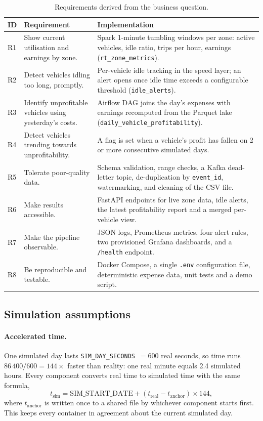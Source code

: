\documentclass[11pt,a4paper]{article}
\newcommand{\code}[1]{\texttt{\small #1}}
\begin{document}
\begin{table}[H]
\centering\small
\begin{tabularx}{\linewidth}{l Y Y}
\toprule
\textbf{ID} & \textbf{Requirement} & \textbf{Implementation} \\
\midrule
R1 & Show current utilisation and earnings by zone. &
Spark 1-minute tumbling windows per zone: active vehicles, idle ratio, trips per hour, earnings
(\code{rt\_zone\_metrics}). \\
R2 & Detect vehicles idling too long, promptly. &
Per-vehicle idle tracking in the speed layer; an alert opens once idle time exceeds a
configurable threshold (\code{idle\_alerts}). \\
R3 & Identify unprofitable vehicles using yesterday's costs. &
Airflow DAG joins the day's expenses with earnings recomputed from the Parquet lake
(\code{daily\_vehicle\_profitability}). \\
R4 & Detect vehicles trending towards unprofitability. &
A flag is set when a vehicle's profit has fallen on 2 or more consecutive simulated days. \\
R5 & Tolerate poor-quality data. &
Schema validation, range checks, a Kafka dead-letter topic, de-duplication by \code{event\_id},
watermarking, and cleaning of the CSV file. \\
R6 & Make results accessible. &
FastAPI endpoints for live zone data, idle alerts, the latest profitability report and a merged
per-vehicle view. \\
R7 & Make the pipeline observable. &
JSON logs, Prometheus metrics, four alert rules, two provisioned Grafana dashboards, and a
\code{/health} endpoint. \\
R8 & Be reproducible and testable. &
Docker Compose, a single \code{.env} configuration file, deterministic expense data, unit tests
and a demo script. \\
\bottomrule
\end{tabularx}
\caption{Requirements derived from the business question.}
\label{tab:req}
\end{table}

\subsection{Simulation assumptions}

\paragraph{Accelerated time.} One simulated day lasts \code{SIM\_DAY\_SECONDS}~$=600$ real
seconds, so time runs $86\,400/600 = 144\times$ faster than reality: one real minute equals 2.4
simulated hours. Every component converts real time to simulated time with the same formula,
\[
  t_{\text{sim}} = \text{SIM\_START\_DATE} + (t_{\text{real}} - t_{\text{anchor}})\times 144,
\]
where $t_{\text{anchor}}$ is written once to a shared file by whichever component starts first.
This keeps every container in agreement about the current simulated day.
\end{document}
